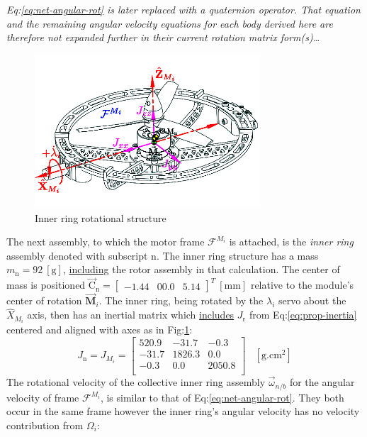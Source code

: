 \emph{\color{gray} Eq:\ref{eq:net-angular-rot} is later replaced with a quaternion operator. That equation and the remaining angular velocity equations for each body derived here are therefore not expanded further in their current rotation matrix form(s)\ldots}
\par
\begin{figure}[htbp]
\vspace{-12pt}
\centering
\includegraphics[width=0.75\textwidth]{figs/inertia-inner}
\vspace{-10pt}
\caption{Inner ring rotational structure}
\label{fig:inertia-inner}
\end{figure}
The next assembly, to which the motor frame $\mathcal{F}^{M_i}$ is attached, is the \emph{inner ring} assembly denoted with subscript n. The inner ring structure has a mass $m_\text{n}=92~[\text{g}]$, \underline{including} the rotor assembly in that calculation. The center of mass is positioned $\vec{\text{C}}_{\text{n}}=\begin{bmatrix}-1.44&00.0&5.14\end{bmatrix}^T~[\text{mm}]$ relative to the module's center of rotation $\vec{\mathbf{M}}_i$. The inner ring, being rotated by the $\lambda_i$ servo about the $\hat{X}_{M_i}$ axis, then has an inertial matrix which \underline{includes} $J_\text{r}$ from Eq:\ref{eq:prop-inertia} centered and aligned with axes as in Fig:\ref{fig:inertia-inner}:
\begin{equation} \label{eq:inertia.inner}
J_\text{n}=J_{M_i}=\begin{bmatrix}
520.9 & -31.7	& -0.3\\
-31.7 & 1826.3 & 0.0\\
-0.3 & 0.0	& 2050.8\\
\end{bmatrix}~~~~[\text{g.cm}^2]
\end{equation}
The rotational velocity of the collective inner ring assembly $\vec{\omega}_{n/b}$ for the angular velocity of frame $\mathcal{F}^{M_i}$, is similar to that of Eq:\ref{eq:net-angular-rot}. They both occur in the same frame however the inner ring's angular velocity has no velocity contribution from $\Omega_i$:
